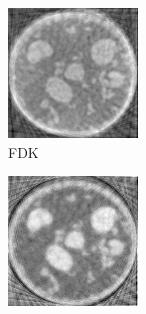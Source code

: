 \documentclass[journal]{IEEEtran}
\begin{document}
\begin{figure}[!h]
\begin{subfigure}[b]{0.3\linewidth}
        \includegraphics[width=\textwidth]{../images/sprouts/fdkIm.png}
        \caption{FDK}
    \end{subfigure}
\quad
    \begin{subfigure}[b]{0.3\linewidth}
        \includegraphics[width=\textwidth]{../images/sprouts/csIm.png}

\end{subfigure}
\end{figure}
\end{document}
